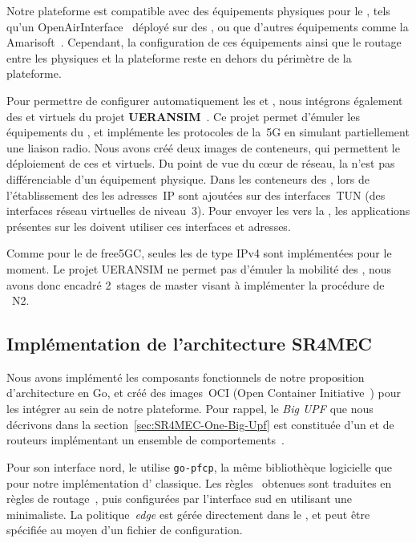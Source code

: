 \documentclass[../main.tex]{subfiles}
\begin{document}
Notre plateforme est compatible avec des équipements physiques pour le , tels qu’un  OpenAirInterface~\cite{OAI.RAN} déployé sur des , ou que d’autres équipements comme la  Amarisoft~\cite{AMARISOFT.CALLBOX}.
Cependant, la configuration de ces équipements ainsi que le routage entre les  physiques et la plateforme reste en dehors du périmètre de la plateforme.

Pour permettre de configurer automatiquement les  et , nous intégrons également des  et  virtuels du projet \textbf{UERANSIM}~\cite{UERANSIM}.
Ce projet permet d’émuler les équipements du , et implémente les protocoles de la~5G en simulant partiellement une liaison radio.
Nous avons créé deux images de conteneurs, qui permettent le déploiement de ces  et  virtuels.
Du point de vue du cœur de réseau, la  n’est pas différenciable d’un équipement physique.
Dans les conteneurs des , lors de l’établissement des  les adresses~IP sont ajoutées sur des interfaces~TUN (des interfaces réseau virtuelles de niveau~3).
Pour envoyer les  vers la , les applications présentes sur les  doivent utiliser ces interfaces et adresses.

Comme pour le  de free5GC, seules les  de type IPv4 sont implémentées pour le moment.
Le projet UERANSIM ne permet pas d’émuler la mobilité des , nous avons donc encadré 2~stages de master visant à implémenter la procédure de ~N2.

\subsection{Implémentation de l’architecture SR4MEC}
Nous avons implémenté les composants fonctionnels de notre proposition d’architecture en Go, et créé des images~OCI (Open Container Initiative~\cite{OCI}) pour les intégrer au sein de notre plateforme.
Pour rappel, le \textit{Big UPF} que nous décrivons dans la section~\ref{sec:SR4MEC-One-Big-Upf} est constituée d’un  et de routeurs implémentant un ensemble de comportements~.

Pour son interface nord, le  utilise \texttt{go-pfcp}, la même bibliothèque logicielle que pour notre implémentation d’ classique.
Les règles~ obtenues sont traduites en règles de routage~, puis configurées par l’interface sud en utilisant une ~ minimaliste.
La politique~\textit{edge} est gérée directement dans le , et peut être spécifiée au moyen d’un fichier de configuration.
\end{document}
